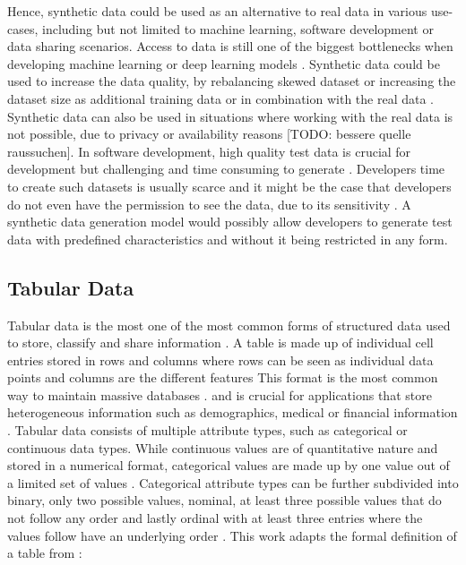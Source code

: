 Hence, synthetic data could be used as an alternative to real data in various use-cases,
including but not limited to machine learning, software development or data sharing scenarios.
Access to data is still one of the biggest bottlenecks when developing machine learning or deep learning \glspl{model} \cite{fan2020RelationalDataSynthesisa}.
Synthetic data could be used to increase the data quality, by rebalancing skewed dataset \cite{zhao2022CTABGANEnhancingTabular} 
or increasing the dataset size as additional training data or in combination with the real data \cite{leminh2021AirGenGANbasedSynthetica, kim2021OCTGANNeuralODEbased}.
Synthetic data can also be used in situations where working with the real data is not possible, due to privacy or availability reasons [TODO: bessere quelle raussuchen]\cite{zhao2022CTABGANEnhancingTabular}.
In software development, high quality test data is crucial for development but challenging and time consuming to generate \cite{whiting2008CreatingRealisticScenariobased}.
Developers time to create such datasets is usually scarce and it might be the case that developers do not even have the permission to see the data, due to its sensitivity \cite{whiting2008CreatingRealisticScenariobased}.
A synthetic data generation \gls{model} would possibly allow developers to generate test data with predefined characteristics and without it being restricted in any form.


\subsection{Tabular Data}
\label{ch:preliminaries-dataSynthesis-tabularData}

Tabular data is the most one of the most common forms of structured data \cite{hernandez2022SyntheticDataGeneration} used to store, classify and share information \cite{pilaluisa2022ContextualWordEmbeddings}.
A table is made up of individual cell entries stored in rows and columns where rows can be seen as individual data points and columns are the different features \cite{borisov2022DeepNeuralNetworks, yoon2020VIMEExtendingSuccess}
This format is the most common way to maintain massive databases \cite{esmaeilpour2022BidiscriminatorGANTabular, yoon2020VIMEExtendingSuccess}.
and is crucial for applications that store heterogeneous information such as demographics, medical or financial information \cite{borisov2022DeepNeuralNetworks, yoon2020VIMEExtendingSuccess}.
Tabular data consists of multiple attribute types, such as categorical or continuous data types\cite{borisov2022DeepNeuralNetworks}.
While continuous values are of quantitative nature and stored in a numerical format, categorical values are made up by one value out of a limited set of values \cite{lederrey2022DATGANIntegratingExperta, lane2003IntroductionStatistics}.
Categorical attribute types can be further subdivided into binary, only two possible values, nominal, at least three possible values that do not follow any order and lastly ordinal with at least three entries where the values follow have an underlying order \cite{lederrey2022DATGANIntegratingExperta}.
This work adapts the formal definition of a table from \cite{xu2019ModelingTabularData}:

